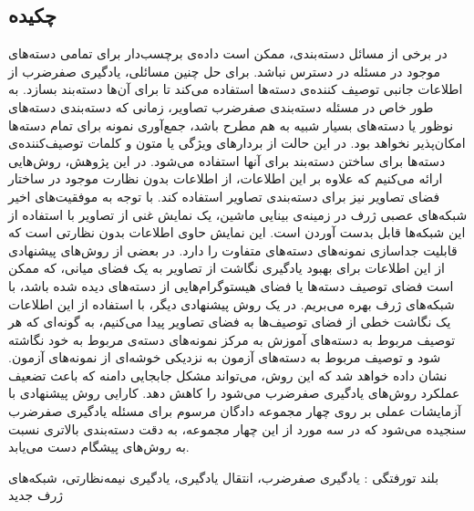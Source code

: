 


\pagestyle{empty}

\subsection*{چکیده}

در برخی از مسائل دسته‌بندی، ممکن است داده‌ی برچسب‌دار برای تمامی دسته‌های موجود در مسئله در دسترس نباشد. برای حل چنین مسائلی، یادگیری صفرضرب از اطلاعات جانبی توصیف کننده‌ی دسته‌ها استفاده می‌کند تا برای آن‌ها دسته‌بند بسازد. به طور خاص در مسئله دسته‌بندی صفرضرب تصاویر، زمانی که دسته‌بندی دسته‌های نوظور یا دسته‌های بسیار شبیه به هم مطرح باشد، جمع‌آوری نمونه برای تمام دسته‌ها امکان‌پذیر نخواهد بود. در این حالت از بردارهای ویژگی یا متون و کلمات توصیف‌کننده‌ی دسته‌ها برای ساختن دسته‌بند برای آنها استفاده می‌شود. در این پژوهش، روش‌هایی ارائه می‌کنیم که علاوه بر این اطلاعات، از اطلاعات بدون نظارت موجود در ساختار فضای تصاویر نیز برای دسته‌بندی تصاویر استفاده کند. با توجه به موفقیت‌های اخیر شبکه‌های عصبی ژرف در زمینه‌ی بینایی ماشین، یک نمایش غنی از تصاویر با استفاده از این شبکه‌ها قابل بدست آوردن است. این نمایش حاوی اطلاعات بدون نظارتی است که قابلیت جداسازی نمونه‌های دسته‌های متفاوت را دارد. در بعضی از روش‌های پیشنهادی از این اطلاعات برای بهبود یادگیری نگاشت از تصاویر به یک فضای میانی، که ممکن است فضای توصیف دسته‌ها یا فضای هیستوگرام‌هایی از دسته‌های دیده شده باشد،  با شبکه‌های ژرف بهره می‌بریم. در یک روش پیشنهادی دیگر، با استفاده از این اطلاعات یک نگاشت خطی از فضای توصیف‌ها به فضای تصاویر پیدا می‌کنیم، به گونه‌ای که هر توصیف مربوط به دسته‌های آموزش به مرکز نمونه‌های دسته‌ی مربوط به خود نگاشته شود و توصیف مربوط به دسته‌های آزمون به نزدیکی خوشه‌ای از نمونه‌های آزمون. نشان داده خواهد شد که این روش،
می‌تواند مشکل جابجایی دامنه که باعث تضعیف عملکرد روش‌های یادگیری صفرضرب می‌شود را کاهش دهد. کارایی روش پیشنهادی با آزمایشات عملی بر روی چهار مجموعه دادگان مرسوم برای مسئله یادگیری صفرضرب سنجیده می‌شود که در سه مورد از این چهار مجموعه، به دقت دسته‌بندی بالاتری نسبت به روش‌های پیشگام دست می‌یابد.


‌بلند
‌تورفتگی : 
یادگیری صفرضرب، انتقال یادگیری، یادگیری نیمه‌نظارتی، شبکه‌های ژرف
‌جدید
